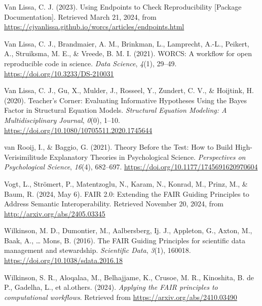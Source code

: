 \documentclass[
  man,floatsintext]{apa6}
\newlength{\cslhangindent}
\newenvironment{CSLReferences}[2] %
 {\begin{list}{}{%
  \setlength{\itemindent}{0pt}
  \setlength{\leftmargin}{0pt}
  \setlength{\parsep}{0pt}
  \ifodd #1
   \setlength{\leftmargin}{\cslhangindent}
   \setlength{\itemindent}{-1\cslhangindent}
  \fi
  \setlength{\itemsep}{#2\baselineskip}}}
 {\end{list}}
\begin{document}
\begin{CSLReferences}{1}{0}
Van Lissa, C. J. (2023). Using {Endpoints} to {Check Reproducibility} {[}Package Documentation{]}. Retrieved March 21, 2024, from \url{https://cjvanlissa.github.io/worcs/articles/endpoints.html}

Van Lissa, C. J., Brandmaier, A. M., Brinkman, L., Lamprecht, A.-L., Peikert, A., Struiksma, M. E., \& Vreede, B. M. I. (2021). {WORCS}: {A} workflow for open reproducible code in science. \emph{Data Science}, \emph{4}(1), 29--49. \url{https://doi.org/10.3233/DS-210031}

Van Lissa, C. J., Gu, X., Mulder, J., Rosseel, Y., Zundert, C. V., \& Hoijtink, H. (2020). Teacher's {Corner}: {Evaluating Informative Hypotheses Using} the {Bayes Factor} in {Structural Equation Models}. \emph{Structural Equation Modeling: A Multidisciplinary Journal}, \emph{0}(0), 1--10. \url{https://doi.org/10.1080/10705511.2020.1745644}

van Rooij, I., \& Baggio, G. (2021). Theory {Before} the {Test}: {How} to {Build High-Verisimilitude Explanatory Theories} in {Psychological Science}. \emph{Perspectives on Psychological Science}, \emph{16}(4), 682--697. \url{https://doi.org/10.1177/1745691620970604}

Vogt, L., Strömert, P., Matentzoglu, N., Karam, N., Konrad, M., Prinz, M., \& Baum, R. (2024, May 6). {FAIR} 2.0: {Extending} the {FAIR Guiding Principles} to {Address Semantic Interoperability}. Retrieved November 20, 2024, from \url{http://arxiv.org/abs/2405.03345}

Wilkinson, M. D., Dumontier, M., Aalbersberg, Ij. J., Appleton, G., Axton, M., Baak, A., \ldots{} Mons, B. (2016). The {FAIR Guiding Principles} for scientific data management and stewardship. \emph{Scientific Data}, \emph{3}(1), 160018. \url{https://doi.org/10.1038/sdata.2016.18}

Wilkinson, S. R., Aloqalaa, M., Belhajjame, K., Crusoe, M. R., Kinoshita, B. de P., Gadelha, L., et al.others. (2024). \emph{Applying the {FAIR} principles to computational workflows}. Retrieved from \url{https://arxiv.org/abs/2410.03490}

\end{CSLReferences}
\end{document}
